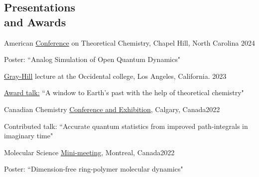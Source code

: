 \documentclass[margin,line]{res}
\newenvironment{list1}{
  \begin{list}{\ding{113}}{%
      \setlength{\itemsep}{0in}
      \setlength{\parsep}{0in} \setlength{\parskip}{0in}
      \setlength{\topsep}{0in} \setlength{\partopsep}{0in} 
      \setlength{\leftmargin}{0.17in}}}{\end{list}}
\begin{document}
\begin{resume}

\section{\sc Presentations \\and Awards}

American \href{https://www.actc2024.org/}{Conference} on Theoretical Chemistry, Chapel Hill, North Carolina \hfill{2024}

\begin{list1}
\item[]Poster: ``Analog Simulation of Open Quantum Dynamics"
\end{list1}

\vspace*{-2.5mm}

\href{https://www.oxy.edu/academics/student-research/urc/2023-summer-research-program}{Gray-Hill} lecture at the Occidental college, Los Angeles, California.  \hfill{2023}

\begin{list1}
\item[]\underline{Award talk:} ``A window to Earth's past with the help of theoretical chemistry"
\end{list1}

\vspace*{-2.5mm}

Canadian Chemistry \href{https://www.cheminst.ca/conference/canadian-chemistry-conference-and-exhibition/}{Conference and Exhibition}, Calgary, Canada\hfill {2022}

\begin{list1}
\item[]Contributed talk: ``Accurate quantum statistics from improved path-integrals in imaginary time" 
\end{list1}
\vspace*{-2.5mm}

Molecular Science \href{https://www.siminegroup.ca/mms/mms2022}{Mini-meeting}, Montreal, Canada\hfill{2022}

\begin{list1}
\item[]Poster: ``Dimension-free ring-polymer molecular dynamics"
\end{list1}

\vspace*{-2.5mm}


\end{resume}
\end{document}
